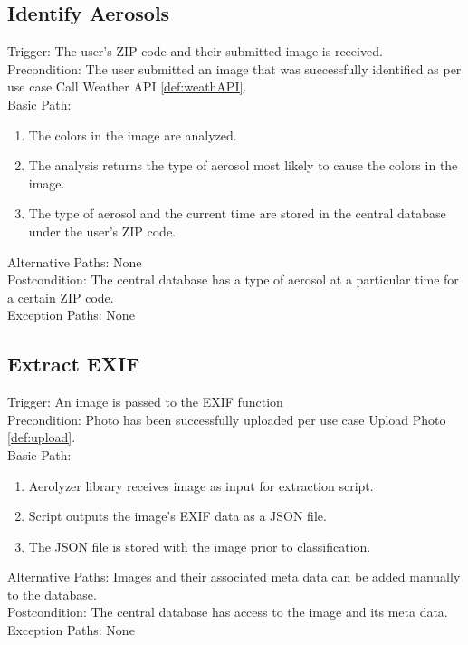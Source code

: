 \documentclass[journal,10pt,draftclsnofoot,onecolumn]{IEEEtran}
\begin{document}
\begin{singlespace}
	\subsection{Identify Aerosols} \label{def:idAero}
		Trigger: The user's ZIP code and their submitted image is received.\\
		Precondition: The user submitted an image that was successfully identified as per use case Call Weather API \ref{def:weathAPI}.\\
		Basic Path:
		\begin{enumerate}
			\item The colors in the image are analyzed.
			\item The analysis returns the type of aerosol most likely to cause the colors in the image.
			\item The type of aerosol and the current time are stored in the central database under the user's ZIP code.
		\end{enumerate}
		Alternative Paths: None\\
		Postcondition: The central database has a type of aerosol at a particular time for a certain ZIP code.\\
		Exception Paths: None

	\subsection{Extract EXIF} \label{def:extexif}
		Trigger: An image is passed to the EXIF function\\
		Precondition: Photo has been successfully uploaded per use case Upload Photo \ref{def:upload}.\\
		Basic Path:
		\begin{enumerate} 
			\item Aerolyzer library receives image as input for extraction script.
			\item Script outputs the image's EXIF data as a JSON file.
			\item The JSON file is stored with the image prior to classification.
		\end{enumerate}
		Alternative Paths: Images and their associated meta data can be added manually to the database.\\
		Postcondition: The central database has access to the image and its meta data.\\
		Exception Paths: None


\end{singlespace}
\end{document}
